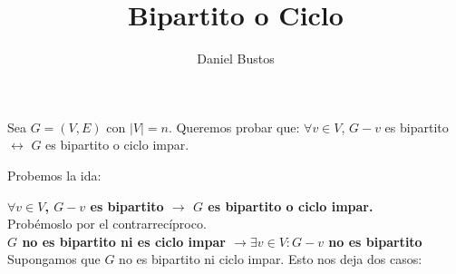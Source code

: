 \documentclass{article}
\title{Bipartito o Ciclo}
\author{Daniel Bustos}
\begin{document}
\maketitle

Sea $G = (V,E)$ con $|V| = n$. Queremos probar que: $\forall v \in V$, $G-v$ es bipartito $\leftrightarrow$ $G$ es bipartito o ciclo impar.

Probemos la ida:

\textbf{$\forall v \in V$, $G-v$ es bipartito $\rightarrow$ $G$ es bipartito o ciclo impar.}\\

Probémoslo por el contrarrecíproco.\\
\textbf{$G$  no es bipartito ni es ciclo impar $\rightarrow \exists v \in V: G-v $ no es bipartito}
Supongamos que $G$ no es bipartito ni ciclo impar. Esto nos deja dos casos:
\end{document}
